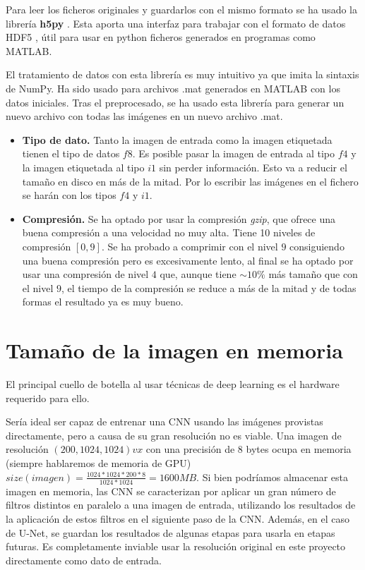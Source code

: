 Para leer los ficheros originales y guardarlos con el mismo formato se ha usado la librería  \textbf{h5py} \cite{Collette2013}. Esta aporta una interfaz para trabajar con el formato de datos HDF5 \cite{HDFGroup20002010}, útil para usar en python ficheros generados en programas como MATLAB.

El tratamiento de datos con esta librería es muy intuitivo ya que imita la sintaxis de NumPy. Ha sido usado para archivos .mat generados en MATLAB con los datos iniciales. Tras el preprocesado, se ha usado esta librería para generar un nuevo archivo con todas las imágenes en un nuevo archivo .mat.

\begin{itemize}
\item \textbf{Tipo de dato.} Tanto la imagen de entrada como la imagen etiquetada tienen el tipo de datos $f8$. Es posible pasar la imagen de entrada al tipo $f4$ y la imagen etiquetada al tipo $i1$ sin perder información. Esto va a reducir el tamaño en disco en más de la mitad. Por lo escribir las imágenes en el fichero se harán con los tipos $f4$ y $i1$.
\item \textbf{Compresión.} Se ha optado por usar la compresión \textit{gzip}, que ofrece una buena compresión a una velocidad no muy alta. Tiene 10 niveles de compresión $[0,9]$. Se ha probado a comprimir con el nivel $9$ consiguiendo una buena compresión pero es excesivamente lento, al final se ha optado por usar una compresión de nivel $4$ que, aunque tiene $\sim 10\%$ más tamaño que con el nivel $9$, el tiempo de la compresión se reduce a más de la mitad y de todas formas el resultado ya es muy bueno.
\end{itemize}

\section{Tamaño de la imagen en memoria}\label{sec:size_problem}

El principal cuello de botella al usar técnicas de deep learning es el hardware requerido para ello. 

Sería ideal ser capaz de entrenar una CNN usando las imágenes provistas directamente, pero a causa de su gran resolución no es viable. Una imagen de resolución $ (200, 1024, 1024)vx $ con una precisión de 8 bytes ocupa en memoria (siempre hablaremos de memoria de GPU) $size(imagen)=\frac{1024*1024*200*8}{1024*1024}=1600MB $. Si bien podríamos almacenar esta imagen en memoria, las CNN se caracterizan por aplicar un gran número de filtros distintos en paralelo a una imagen de entrada, utilizando los resultados de la aplicación de estos filtros en el siguiente paso de la CNN. Además, en el caso de U-Net, se guardan los resultados de algunas etapas para usarla en etapas futuras. Es completamente inviable usar la resolución original en este proyecto directamente como dato de entrada.

